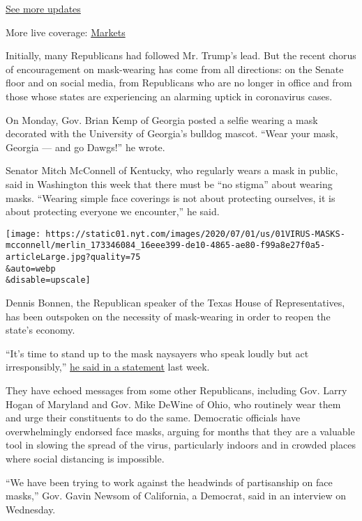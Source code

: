 \href{https://www.nytimes.com/2020/08/01/world/coronavirus-covid-19.html?action=click\&pgtype=Article\&state=default\&region=MAIN_CONTENT_1\&context=storylines_live_updates}{See
more updates}

More live coverage:
\href{https://www.nytimes.com/live/2020/07/31/business/stock-market-today-coronavirus?action=click\&pgtype=Article\&state=default\&region=MAIN_CONTENT_1\&context=storylines_live_updates}{Markets}

Initially, many Republicans had followed Mr. Trump's lead. But the
recent chorus of encouragement on mask-wearing has come from all
directions: on the Senate floor and on social media, from Republicans
who are no longer in office and from those whose states are experiencing
an alarming uptick in coronavirus cases.

On Monday, Gov. Brian Kemp of Georgia posted a selfie wearing a mask
decorated with the University of Georgia's bulldog mascot. ``Wear your
mask, Georgia --- and go Dawgs!'' he wrote.

Senator Mitch McConnell of Kentucky, who regularly wears a mask in
public, said in Washington this week that there must be ``no stigma''
about wearing masks. ``Wearing simple face coverings is not about
protecting ourselves, it is about protecting everyone we encounter,'' he
said.

\texttt{[image: https://static01.nyt.com/images/2020/07/01/us/01VIRUS-MASKS-mcconnell/merlin\_173346084\_16eee399-de10-4865-ae80-f99a8e27f0a5-articleLarge.jpg?quality=75\\\&auto=webp\\\&disable=upscale]}

Dennis Bonnen, the Republican speaker of the Texas House of
Representatives, has been outspoken on the necessity of mask-wearing in
order to reopen the state's economy.

``It's time to stand up to the mask naysayers who speak loudly but act
irresponsibly,''
\href{https://twitter.com/RepDennisBonnen/status/1275186700306853889}{he
said in a statement} last week.

They have echoed messages from some other Republicans, including Gov.
Larry Hogan of Maryland and Gov. Mike DeWine of Ohio, who routinely wear
them and urge their constituents to do the same. Democratic officials
have overwhelmingly endorsed face masks, arguing for months that they
are a valuable tool in slowing the spread of the virus, particularly
indoors and in crowded places where social distancing is impossible.

``We have been trying to work against the headwinds of partisanship on
face masks,'' Gov. Gavin Newsom of California, a Democrat, said in an
interview on Wednesday.

